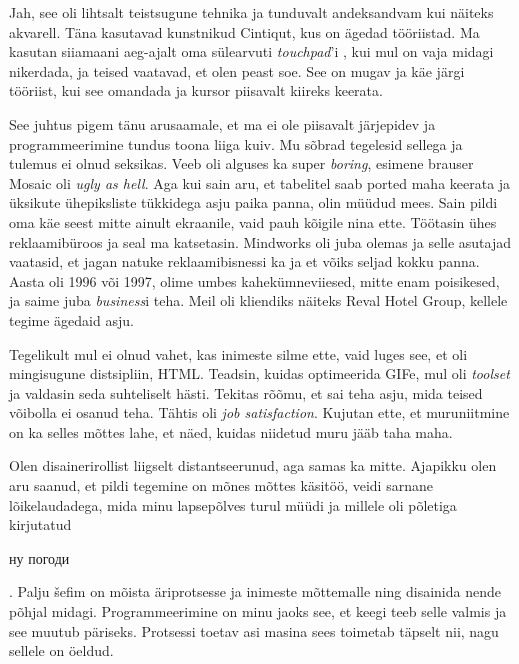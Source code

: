 
Jah, see oli lihtsalt teistsugune tehnika ja tunduvalt andeksandvam 
kui näiteks akvarell. Täna kasutavad kunstnikud 
Cintiqut, kus on ägedad tööriistad. Ma kasutan siiamaani aeg-ajalt oma 
sülearvuti \emph{touchpad}'i , 
kui mul on vaja midagi nikerdada, ja teised
vaatavad, et olen peast soe. See on mugav ja käe järgi tööriist, kui see 
omandada ja kursor piisavalt kiireks keerata.

 
See juhtus pigem tänu arusaamale, et ma ei ole piisavalt 
järjepidev ja programmeerimine tundus toona liiga kuiv. Mu sõbrad 
tegelesid sellega ja tulemus ei olnud seksikas. Veeb oli alguses ka super 
\emph{boring}, esimene brauser Mosaic oli \emph{ugly 
as hell}. Aga kui sain aru, et tabelitel saab ported maha keerata ja 
üksikute ühepiksliste tükkidega asju paika panna, 
olin müüdud mees. Sain pildi oma käe seest mitte ainult
ekraanile, vaid pauh kõigile nina ette. 
Töötasin ühes reklaamibüroos ja seal ma katsetasin. 
Mindworks oli juba olemas ja selle asutajad vaatasid, et jagan 
natuke reklaamibisnessi ka ja et võiks seljad kokku panna. Aasta 
oli 1996 või 1997, olime umbes kahekümneviiesed, mitte enam
poisikesed, ja saime juba \emph{business}i teha.
Meil oli kliendiks näiteks Reval Hotel Group, kellele tegime ägedaid asju.


Tegelikult mul ei olnud vahet, kas inimeste silme ette, vaid luges
see, et oli mingisugune distsipliin, HTML. Teadsin, kuidas 
optimeerida GIFe, mul oli \emph{toolset} ja valdasin seda 
suhteliselt hästi. Tekitas rõõmu, et sai teha asju, mida 
teised võibolla ei osanud teha. Tähtis oli \emph{job satisfaction}. Kujutan 
ette, et muruniitmine on ka selles mõttes lahe, et näed, kuidas 
niidetud muru jääb taha maha.


Olen disainerirollist liigselt distantseerunud, aga samas ka
mitte. Ajapikku olen aru saanud, et pildi tegemine on mõnes mõttes 
käsitöö, veidi sarnane lõikelaudadega, mida minu lapsepõlves 
turul müüdi ja millele oli põletiga kirjutatud \begin{russian}ну 
погоди\end{russian}. Palju šefim on mõista
äriprotsesse ja inimeste mõttemalle ning 
disainida nende põhjal midagi. Programmeerimine on minu jaoks see, et keegi 
teeb selle valmis ja see muutub 
päriseks. Protsessi toetav asi masina sees toimetab täpselt nii, nagu 
sellele on öeldud. 

